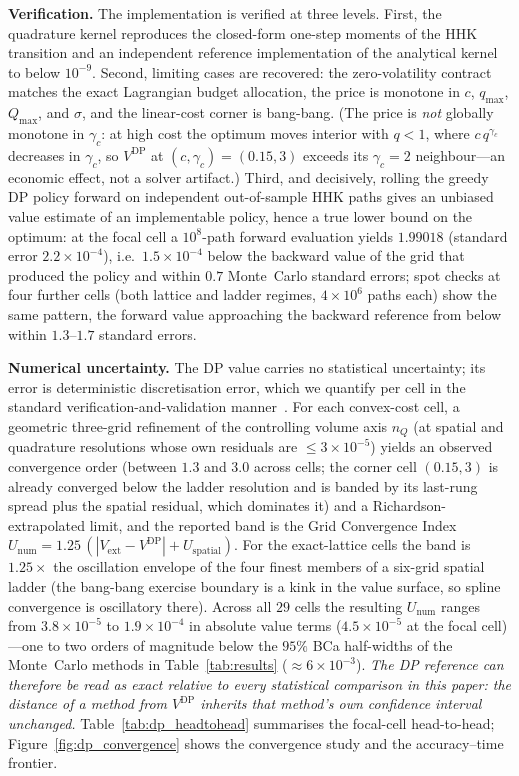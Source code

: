 \documentclass[a4paper,fleqn]{cas-dc}
\newcommand{\hlblock}[1]{\par\noindent
    \colorbox{chgyellow}{\parbox{\dimexpr\linewidth-2\fboxsep\relax}{#1}}\par}
\newcommand{\hlpar}[2]{\hlblock{\textbf{#1} #2}}
\newcommand{\hlblock}[1]{#1}
\newcommand{\hlpar}[2]{\paragraph{#1} #2}
\begin{document}
\hlpar{Verification.}{The implementation is verified at three levels. First, the quadrature kernel reproduces the closed-form one-step moments of the HHK transition and an independent reference implementation of the analytical kernel to below $10^{-9}$. Second, limiting cases are recovered: the zero-volatility contract matches the exact Lagrangian budget allocation, the price is monotone in $c$, $q_{\max}$, $Q_{\max}$, and $\sigma$, and the linear-cost corner is bang-bang. (The price is \emph{not} globally monotone in $\gamma_c$: at high cost the optimum moves interior with $q<1$, where $c\,q^{\gamma_c}$ decreases in $\gamma_c$, so $V^{\mathrm{DP}}$ at $(c,\gamma_c)=(0.15,3)$ exceeds its $\gamma_c=2$ neighbour---an economic effect, not a solver artifact.) Third, and decisively, rolling the greedy DP policy forward on independent out-of-sample HHK paths gives an unbiased value estimate of an implementable policy, hence a true lower bound on the optimum: at the focal cell a $10^8$-path forward evaluation yields $1.99018$ (standard error $2.2\times10^{-4}$), i.e.\ $1.5\times10^{-4}$ below the backward value of the grid that produced the policy and within $0.7$ Monte~Carlo standard errors; spot checks at four further cells (both lattice and ladder regimes, $4\times10^6$ paths each) show the same pattern, the forward value approaching the backward reference from below within $1.3$--$1.7$ standard errors.}

\hlpar{Numerical uncertainty.}{The DP value carries no statistical uncertainty; its error is deterministic discretisation error, which we quantify per cell in the standard verification-and-validation manner~\cite{roache1994perspective,asme2009vv20,eca2014procedure}. For each convex-cost cell, a geometric three-grid refinement of the controlling volume axis $n_Q$ (at spatial and quadrature resolutions whose own residuals are $\le 3\times10^{-5}$) yields an observed convergence order (between $1.3$ and $3.0$ across cells; the corner cell $(0.15,3)$ is already converged below the ladder resolution and is banded by its last-rung spread plus the spatial residual, which dominates it) and a Richardson-extrapolated limit, and the reported band is the Grid Convergence Index $U_{\mathrm{num}} = 1.25\,(|V_{\mathrm{ext}}-V^{\mathrm{DP}}| + U_{\mathrm{spatial}})$. For the exact-lattice cells the band is $1.25\times$ the oscillation envelope of the four finest members of a six-grid spatial ladder (the bang-bang exercise boundary is a kink in the value surface, so spline convergence is oscillatory there). Across all $29$ cells the resulting $U_{\mathrm{num}}$ ranges from $3.8\times10^{-5}$ to $1.9\times10^{-4}$ in absolute value terms ($4.5\times10^{-5}$ at the focal cell)---one to two orders of magnitude below the $95\%$ BCa half-widths of the Monte~Carlo methods in Table~\ref{tab:results} ($\approx 6\times10^{-3}$). \emph{The DP reference can therefore be read as exact relative to every statistical comparison in this paper: the distance of a method from $V^{\mathrm{DP}}$ inherits that method's own confidence interval unchanged.} Table~\ref{tab:dp_headtohead} summarises the focal-cell head-to-head; Figure~\ref{fig:dp_convergence} shows the convergence study and the accuracy--time frontier.}
\end{document}
